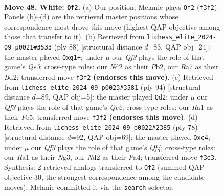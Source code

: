 \documentclass[11pt]{article}
\begin{document}
\clearpage

\begin{figure}[p]\centering
\begin{subfigure}{0.46\textwidth}\centering
\resizebox{\linewidth}{!}{%
\newchessgame
\chessboard[
  setfen={1r2r3/Rb3p1k/1p4p1/8/3q3P/1P3Q2/2PN4/R2B2K1 w - - 0 48},
  showmover=false,
  pgfstyle=straightmove, color=movearrow, markmove={f3-f2}
]}
\caption{}
\end{subfigure}\hfill
\begin{subfigure}{0.46\textwidth}\centering
\resizebox{\linewidth}{!}{%
\newchessgame
\chessboard[
  setfen={3b1rk1/3R3p/p6p/4P3/r4P2/4Q3/1P1B3K/6q1 w - - 0 45},
  showmover=false,
  pgfstyle=straightmove, color=movearrow, markmove={e3-g1}
]}
\caption{}
\end{subfigure}
\\[4pt]
\begin{subfigure}{0.46\textwidth}\centering
\resizebox{\linewidth}{!}{%
\newchessgame
\chessboard[
  setfen={3r2k1/5p2/8/2p1PP2/1p2R1P1/3b3P/2Q3BK/q7 w - - 3 48},
  showmover=false,
  pgfstyle=straightmove, color=movearrow, markmove={c2-d2}
]}
\caption{}
\end{subfigure}\hfill
\begin{subfigure}{0.46\textwidth}\centering
\resizebox{\linewidth}{!}{%
\newchessgame
\chessboard[
  setfen={8/5p1k/5br1/p2p4/P1q2Q1P/6N1/5P2/5K1R w - - 6 40},
  showmover=false,
  pgfstyle=straightmove, color=movearrow, markmove={f4-c4}
]}
\caption{}
\end{subfigure}
\caption{\textbf{Move 48, White: \texttt{Qf2}.} (a) Our position; Melanie plays \texttt{Qf2} (\texttt{f3f2}). Panels (b)--(d) are the retrieved master positions whose correspondence most drove this move (highest QAP objective among those that transfer to it). (b) Retrieved from \texttt{lichess\_elite\_2024-09\_p0021\#3533} (ply 88) [structural distance $d$=83, QAP obj=24]: the master played \texttt{Qxg1+}; under $\mu$ our \emph{Qf3} plays the role of that game's \emph{Qe3}; cross-type roles: our \emph{N}d2 as their \emph{P}b2, our \emph{R}a7 as their \emph{B}d2; transferred move \texttt{f3f2} \textbf{(endorses this move)}. (c) Retrieved from \texttt{lichess\_elite\_2024-09\_p0023\#3581} (ply 94) [structural distance $d$=89, QAP obj=5]: the master played \texttt{Qd2}; under $\mu$ our \emph{Qf3} plays the role of that game's \emph{Qc2}; cross-type roles: our \emph{R}a1 as their \emph{P}e5; transferred move \texttt{f3f2} \textbf{(endorses this move)}. (d) Retrieved from \texttt{lichess\_elite\_2024-09\_p0022\#2385} (ply 78) [structural distance $d$=92, QAP obj=69]: the master played \texttt{Qxc4}; under $\mu$ our \emph{Qf3} plays the role of that game's \emph{Qf4}; cross-type roles: our \emph{R}a1 as their \emph{N}g3, our \emph{N}d2 as their \emph{P}a4; transferred move \texttt{f3e3}. Synthesis: 2 retrieved analogs transferred to \texttt{Qf2} (summed QAP objective 30, the strongest correspondence among the candidate moves); Melanie committed it via the \texttt{search} selector.}
\label{fig:thought-m94}
\end{figure}
\end{document}

